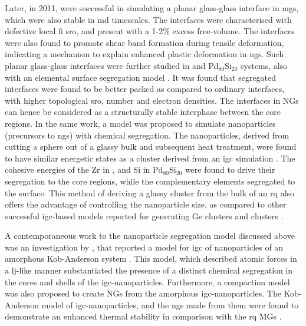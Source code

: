 Later, in 2011, \textcite{Ritter2011} were successful in simulating a planar glass-glass interface in \czsix \gls{mg}s, which were also stable in \gls{md} timescales. The interfaces were characterised with defective local \gls{fi} \gls{sro}, and present with a 1-2\% excess free-volume. The interfaces were also found to promote shear band formation during tensile deformation, indicating a mechanism to explain enhanced plastic deformation in \gls{ng}s. 
Such planar glass-glass interfaces were further studied in \czsix and Pd$_{80}$Si$_{20}$ systems, also with an elemental surface segregation model \cite{Adjaoud2016}. It was found that segregated interfaces were found to be better packed as compared to ordinary interfaces, with higher topological \gls{sro}, number and electron densities. The interfaces in NGs can hence be 
considered as a structurally stable interphase between the core regions. In the same work, a model was proposed to simulate nanoparticles (precursors to \gls{ng}s) with chemical segregation. The nanoparticles, derived from cutting a sphere out of a glassy bulk and subsequent heat treatment, were found to have similar energetic states as a cluster derived from an \gls{igc} simulation \cite{Adjaoud2016}. The cohesive energies of the Zr in \cz, and Si in Pd$_{80}$Si$_{20}$ were found to drive their segregation to the core regions, while the complementary elements segregated to the surface. This method of deriving a glassy cluster from the bulk of an \gls{rq} also offers the advantage of controlling the nanoparticle size, as compared to other successful \gls{igc}-based models reported for generating Ge clusters 
\cite{Krasnochtchekov2003} and \czsix clusters \cite{Zheng2020}. \par

A contemporaneous work to the nanoparticle segregation model discussed above \cite{Adjaoud2016} was an investigation by \textcite{Danilov2016}, that reported a model for \gls{igc} of nanoparticles of an amorphous Kob-Anderson system \cite{Kob1995}. This model, which described atomic forces in a \gls{lj}-like manner substantiated the presence of a distinct chemical segregation in the cores and shells of the \gls{igc}-nanoparticles. Furthermore, a compaction model was also proposed to create NGs from the amorphous \gls{igc}-nanoparticles. The Kob-Anderson model of \gls{igc}-nanoparticles, and the \gls{ng}s made from them were found to demonstrate an enhanced thermal stability in comparison with the \gls{rq} MGs \cite{Danilov2016}. \par

